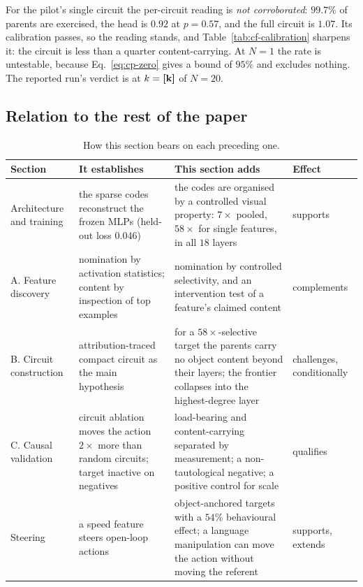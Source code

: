 For the pilot's single circuit the per-circuit reading is \emph{not
corroborated}: $99.7\%$ of parents are exercised, the head is $0.92$ at
$p=0.57$, and the full circuit is $1.07$. Its calibration passes, so the
reading stands, and Table~\ref{tab:cf-calibration} sharpens it: the circuit is
less than a quarter content-carrying. At $N=1$ the rate is untestable, because
Eq.~\ref{eq:cp-zero} gives a bound of $95\%$ and excludes nothing. The reported
run's verdict is  at
$k=\textbf{[k]}$ of $N=20$.

\subsection{Relation to the rest of the paper}
\label{sec:relation}

\begin{table}[t]
\caption{How this section bears on each preceding one.}
\label{tab:cf-relation}
\begin{center}
\small
\begin{tabular}{p{0.9in}p{1.55in}p{1.6in}p{0.7in}}
\hline
Section & It establishes & This section adds & Effect \\
\hline
Architecture and training & the sparse codes reconstruct the frozen MLPs (held-out loss $0.046$) & the codes are organised by a controlled visual property: $7\times$ pooled, $58\times$ for single features, in all $18$ layers & supports \\
A. Feature discovery & nomination by activation statistics; content by inspection of top examples & nomination by controlled selectivity, and an intervention test of a feature's claimed content & complements \\
B. Circuit construction & attribution-traced compact circuit as the main hypothesis & for a $58\times$-selective target the parents carry no object content beyond their layers; the frontier collapses into the highest-degree layer & challenges, conditionally \\
C. Causal validation & circuit ablation moves the action $2\times$ more than random circuits; target inactive on negatives & load-bearing and content-carrying separated by measurement; a non-tautological negative; a positive control for scale & qualifies \\
Steering & a speed feature steers open-loop actions & object-anchored targets with a $54\%$ behavioural effect; a language manipulation can move the action without moving the referent & supports, extends \\
\hline
\end{tabular}
\end{center}
\end{table}

